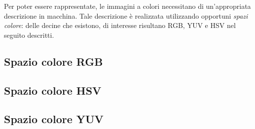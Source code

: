 \documentclass{subfiles}
\begin{document}
Per poter essere rappresentate, le immagini a colori necessitano di un'appropriata descrizione in macchina.
Tale descrizione è realizzata utilizzando opportuni \emph{spazi colore}: delle decine che esistono, di interesse risultano RGB, YUV e HSV nel seguito descritti.

\subsection{Spazio colore RGB}


\subsection{Spazio colore HSV}


\subsection{Spazio colore YUV}

\clearpage
\end{document}
